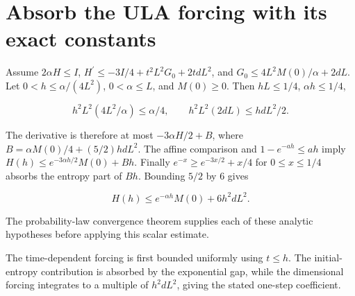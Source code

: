 \documentclass[11pt,a4paper]{article}
\begin{document}
\section{\texorpdfstring{Absorb the ULA forcing with its exact constants}{Absorb the ULA forcing with its exact constants}}


Assume \(2\alpha H\le I\), \(H^{\prime}\le-3I/4+t^2L^2G_0+2tdL^2\), and \(G_0\le4L^2M(0)/\alpha+2dL\). Let \(0<h\le\alpha/(4L^2)\), \(0<\alpha\le L\), and \(M(0)\ge0\). Then \(hL\le1/4\), \(\alpha h\le1/4\),

\[h^2L^2(4L^2/\alpha)\le\alpha/4,\qquad h^2L^2(2dL)\le hdL^2/2.\]

The derivative is therefore at most \(-3\alpha H/2+B\), where \(B=\alpha M(0)/4+(5/2)hdL^2\). The affine comparison and \(1-e^{-ah}\le ah\) imply \(H(h)\le e^{-3\alpha h/2}M(0)+Bh\). Finally \(e^{-x}\ge e^{-3x/2}+x/4\) for \(0\le x\le1/4\) absorbs the entropy part of \(Bh\). Bounding \(5/2\) by 6 gives

\[H(h)\le e^{-\alpha h}M(0)+6h^2dL^2.\]

The probability-law convergence theorem supplies each of these analytic hypotheses before applying this scalar estimate.



The time-dependent forcing is first bounded uniformly using \(t\le h\). The initial-entropy contribution is absorbed by the exponential gap, while the dimensional forcing integrates to a multiple of \(h^2dL^2\), giving the stated one-step coefficient.
\end{document}
